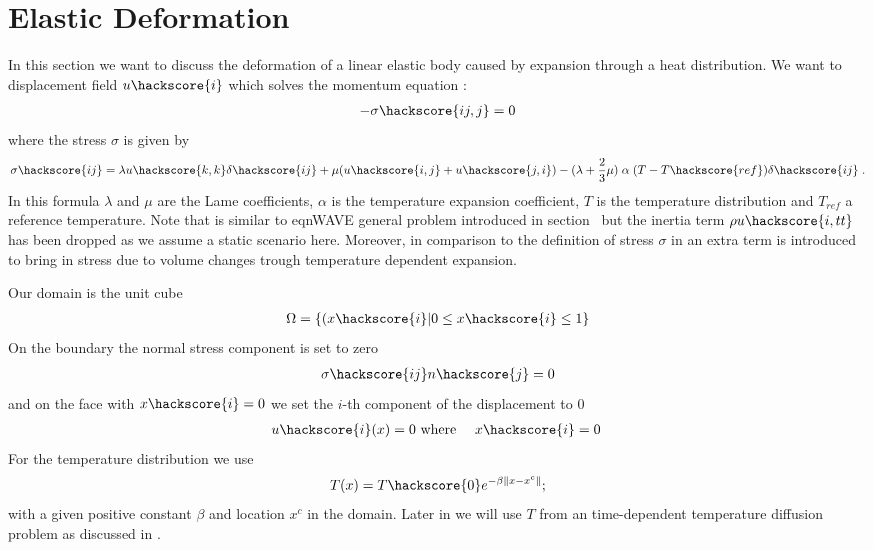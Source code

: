\section{Elastic Deformation}
\label{ELASTIC CHAP}
In this section we want to discuss the deformation of a linear elastic body caused by expansion through a heat distribution. We want 
to displacement field $u\hackscore{i}$ which solves the momentum equation
:
\begin{eqnarray}\label{HEATEDBLOCK general problem}
 - \sigma\hackscore{ij,j}=0
\end{eqnarray}
where the stress $\sigma$ is given by
\begin{eqnarray}\label{HEATEDBLOCK linear elastic}
 \sigma\hackscore{ij}= \lambda u\hackscore{k,k} \delta\hackscore{ij} + \mu ( u\hackscore{i,j} + u\hackscore{j,i})
 - (\lambda+\frac{2}{3} \mu)  \; \alpha  \;  (T-T\hackscore{ref})\delta\hackscore{ij} \;.
\end{eqnarray}
In this formula $\lambda$ and $\mu$ are the Lame coefficients, $\alpha$ is the 
temperature expansion coefficient, $T$ is the temperature distribution and $T_{ref}$ a reference temperature. Note that 
 is similar to eqn{WAVE general problem} introduced in section~ but the
inertia term $\rho u\hackscore{i,tt}$ has been dropped as we assume a static scenario here. Moreover, in 
comparison to the 
definition of stress $\sigma$ in  an extra term is introduced 
to bring in stress due to volume changes trough temperature dependent expansion.   

Our domain is the unit cube 
\begin{eqnarray} \label{HEATEDBLOCK natural}
\Omega=\{(x\hackscore{i} | 0 \le x\hackscore{i} \le 1 \}
\end{eqnarray}
On the boundary the normal stress component is set to zero
\begin{eqnarray} \label{HEATEDBLOCK natural}
\sigma\hackscore{ij}n\hackscore{j}=0
\end{eqnarray}
and on the face with $x\hackscore{i}=0$ we set the $i$-th component of the displacement to $0$
\begin{eqnarray} \label{HEATEDBLOCK constraint}
u\hackscore{i}(x)=0 & \mbox{ where } & x\hackscore{i}=0 \; 
\end{eqnarray}
For the temperature distribution we use 
\begin{eqnarray} \label{HEATEDBLOCK temperature}
T(x)= T\hackscore{0} e^{-\beta \|x-x^{c}\|}; 
\end{eqnarray}
with a given positive constant $\beta$ and location $x^{c}$ in the domain. Later in  we will use
$T$ from an time-dependent temperature diffusion problem as discussed in .
   

